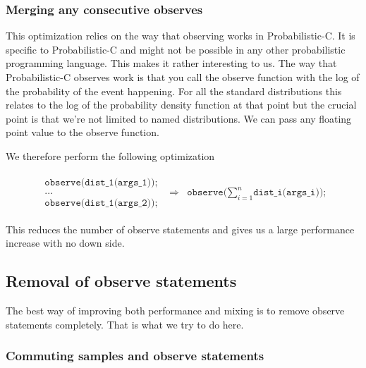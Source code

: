 \documentclass[a4paper]{article}
\newcommand{\optimization}[2]{
	\[
		\begin{array}{rcl}
			#1 & \Rightarrow & #2
		\end{array}
	\]
}
\begin{document}
\subsubsection{Merging any consecutive observes}

This optimization relies on the way that observing works in Probabilistic-C. It is specific to Probabilistic-C and might not be possible in any other probabilistic programming language. This makes it rather interesting to us. The way that Probabilistic-C observes work is that you call the observe function with the log of the probability of the event happening. For all the standard distributions this relates to the log of the probability density function at that point but the crucial point is that we're not limited to named distributions. We can pass any floating point value to the observe function.

We therefore perform the following optimization
\optimization{
	\begin{array}{l}
		\texttt{observe(dist\_1(args\_1));} \\
		\texttt{...} \\
		\texttt{observe(dist\_1(args\_2));}
	\end{array}
}{
	\texttt{observe(}\sum_{i=1}^n\texttt{dist\_i(args\_i));}
}

This reduces the number of observe statements and gives us a large performance increase with no down side.




\subsection{Removal of observe statements}

The best way of improving both performance and mixing is to remove observe statements completely. That is what we try to do here.




\subsubsection{Commuting samples and observe statements}
\end{document}
